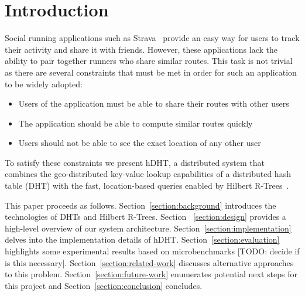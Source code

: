 \section{Introduction}
Social running applications such as Strava~\cite{strava} provide an easy way for users to track their activity and share it with friends. However, these applications lack the ability to pair together runners who share similar routes. This task is not trivial as there are several constraints that must be met in order for such an application to be widely adopted:
\begin{itemize}
	\item Users of the application must be able to share their routes with other users
	\item The application should be able to compute similar routes quickly
	\item Users should not be able to see the exact location of any other user
\end{itemize}

To satisfy these constraints we present hDHT, a distributed system that combines the geo-distributed key-value lookup capabilities of a distributed hash table (DHT) with the fast, location-based queries enabled by Hilbert R-Trees~\cite{kamel1993hilbert}.


This paper proceeds as follows. Section~\ref{section:background} introduces the technologies of DHTs and Hilbert R-Trees. Section ~\ref{section:design} provides a high-level overview of our system architecture. Section~\ref{section:implementation} delves into the implementation details of hDHT. Section~\ref{section:evaluation} highlights some experimental results based on microbenchmarks [TODO: decide if is this necessary]. Section~\ref{section:related-work} discusses alternative approaches to this problem. Section~\ref{section:future-work} enumerates potential next steps for this project and Section~\ref{section:conclusion} concludes.